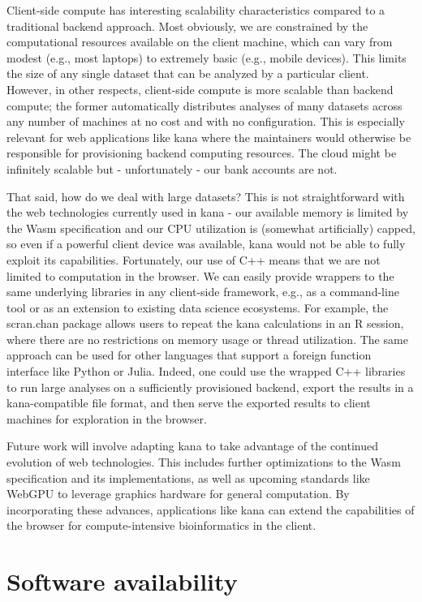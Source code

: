 \documentclass{article}
\begin{document}
Client-side compute has interesting scalability characteristics compared to a traditional backend approach.
Most obviously, we are constrained by the computational resources available on the client machine,
which can vary from modest (e.g., most laptops) to extremely basic (e.g., mobile devices).
This limits the size of any single dataset that can be analyzed by a particular client.
However, in other respects, client-side compute is more scalable than backend compute;
the former automatically distributes analyses of many datasets across any number of machines at no cost and with no configuration.
This is especially relevant for web applications like kana where the maintainers would otherwise be responsible for provisioning backend computing resources.
The cloud might be infinitely scalable but - unfortunately - our bank accounts are not.

That said, how do we deal with large datasets?
This is not straightforward with the web technologies currently used in kana -
our available memory is limited by the Wasm specification and our CPU utilization is (somewhat artificially) capped,
so even if a powerful client device was available, kana would not be able to fully exploit its capabilities.
Fortunately, our use of C++ means that we are not limited to computation in the browser.
We can easily provide wrappers to the same underlying libraries in any client-side framework, e.g., as a command-line tool or as an extension to existing data science ecosystems.
For example, the scran.chan package \cite{scranchan} allows users to repeat the kana calculations in an R session,
where there are no restrictions on memory usage or thread utilization.
The same approach can be used for other languages that support a foreign function interface like Python or Julia.
Indeed, one could use the wrapped C++ libraries to run large analyses on a sufficiently provisioned backend, 
export the results in a kana-compatible file format,
and then serve the exported results to client machines for exploration in the browser. 

Future work will involve adapting kana to take advantage of the continued evolution of web technologies.
This includes further optimizations to the Wasm specification and its implementations,
as well as upcoming standards like WebGPU to leverage graphics hardware for general computation.
By incorporating these advances, applications like kana can extend the capabilities of the browser for compute-intensive bioinformatics in the client.

\section{Software availability}
\end{document}
